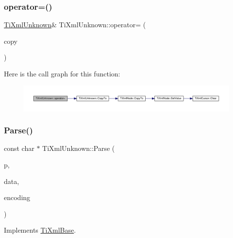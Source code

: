 \subsubsection{\texorpdfstring{operator=()}{operator=()}}
{\footnotesize\ttfamily \hyperlink{class_ti_xml_unknown}{Ti\+Xml\+Unknown}\& Ti\+Xml\+Unknown\+::operator= (\begin{DoxyParamCaption}\item[{const \hyperlink{class_ti_xml_unknown}{Ti\+Xml\+Unknown} \&}]{copy }\end{DoxyParamCaption})\hspace{0.3cm}{\ttfamily [inline]}}

Here is the call graph for this function\+:\nopagebreak
\begin{figure}[H]
\begin{center}
\leavevmode
\includegraphics[width=350pt]{class_ti_xml_unknown_a60560b5aacb4bdc8b2b5f02f0a99c5c0_cgraph}
\end{center}
\end{figure}
\mbox{\label{class_ti_xml_unknown_aa51c2694e4177b5f0b5429ee5a81b58d}} 
\subsubsection{\texorpdfstring{Parse()}{Parse()}}
{\footnotesize\ttfamily const char $\ast$ Ti\+Xml\+Unknown\+::\+Parse (\begin{DoxyParamCaption}\item[{const char $\ast$}]{p,  }\item[{\hyperlink{class_ti_xml_parsing_data}{Ti\+Xml\+Parsing\+Data} $\ast$}]{data,  }\item[{\hyperlink{tinyxml_8h_a88d51847a13ee0f4b4d320d03d2c4d96}{Ti\+Xml\+Encoding}}]{encoding }\end{DoxyParamCaption})\hspace{0.3cm}{\ttfamily [virtual]}}



Implements \hyperlink{class_ti_xml_base_a00e4edb0219d00a1379c856e5a1d2025}{Ti\+Xml\+Base}.

